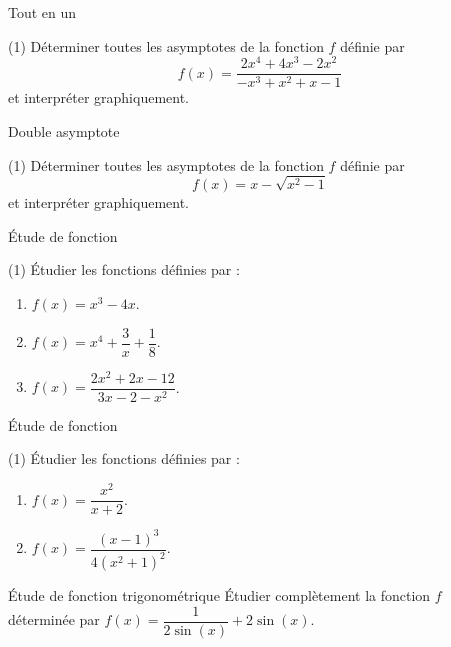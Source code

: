 \documentclass[a4paper,12pt]{article}
\begin{document}
\begin{activite}{Tout en un}
\tcblower
\begin{tasks}(1)
  \task Déterminer toutes les asymptotes de la fonction \(f\) définie par
  \[
    f(x)=\dfrac{2x^4+4x^3-2x^2}{-x^3+x^2+x-1}
  \]
  et interpréter graphiquement.
\end{tasks}
\end{activite}

\begin{activite}{Double asymptote}
\tcblower
\begin{tasks}(1)
  \task Déterminer toutes les asymptotes de la fonction \(f\) définie par
  \[
    f(x)=x-\sqrt{x^2-1}
  \]
  et interpréter graphiquement.
\end{tasks}
\end{activite}

\begin{activite}{Étude de fonction}
\tcblower
\begin{tasks}(1)
  \task Étudier les fonctions définies par :
  \begin{enumerate}
    \item \(f(x)=x^3-4x\).
    \item \(f(x)=x^4+\dfrac{3}{x}+\dfrac{1}{8}\).
    \item \(f(x)=\dfrac{2x^2+2x-12}{3x-2-x^2}\).
  \end{enumerate}
\end{tasks}
\end{activite}

\begin{activite}{Étude de fonction}
\tcblower
\begin{tasks}(1)
  \task Étudier les fonctions définies par :
  \begin{enumerate}
    \item \(f(x)=\dfrac{x^2}{x+2}\).
    \item \(f(x)=\dfrac{(x-1)^3}{4(x^2+1)^2}\).
  \end{enumerate}
\end{tasks}
\end{activite}

\begin{activite}{Étude de fonction trigonométrique}
\tcblower
Étudier complètement la fonction $f$ déterminée par $f(x) = \dfrac{1}{2\sin(x)} + 2\sin(x)$.
\end{activite}
\end{document}

